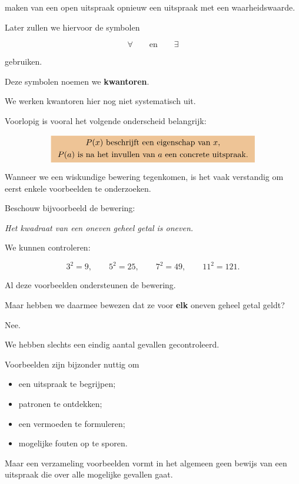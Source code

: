 \documentclass{ximera}
\begin{document}
maken van een open uitspraak opnieuw een uitspraak met een
waarheidswaarde.

Later zullen we hiervoor de symbolen

\[
\forall
\qquad\text{en}\qquad
\exists
\]

gebruiken.

Deze symbolen noemen we \textbf{kwantoren}.


\begin{opmerking}
We werken kwantoren hier nog niet systematisch uit.

Voorlopig is vooral het volgende onderscheid belangrijk:

\[
\important{
\begin{array}{c}
P(x) \text{ beschrijft een eigenschap van }x,\\[1mm]
P(a) \text{ is na het invullen van }a\text{ een concrete uitspraak.}
\end{array}
}
\]
\end{opmerking}



Wanneer we een wiskundige bewering tegenkomen, is het vaak verstandig
om eerst enkele voorbeelden te onderzoeken.

Beschouw bijvoorbeeld de bewering:

\begin{center}
\textit{Het kwadraat van een oneven geheel getal is oneven.}
\end{center}

We kunnen controleren:

\[
3^2=9,
\qquad
5^2=25,
\qquad
7^2=49,
\qquad
11^2=121.
\]

Al deze voorbeelden ondersteunen de bewering.

Maar hebben we daarmee bewezen dat ze voor \textbf{elk} oneven geheel
getal geldt?

Nee.

We hebben slechts een eindig aantal gevallen gecontroleerd.


\begin{opmerking}
Voorbeelden zijn bijzonder nuttig om

\begin{itemize}
  \item een uitspraak te begrijpen;
  \item patronen te ontdekken;
  \item een vermoeden te formuleren;
  \item mogelijke fouten op te sporen.
\end{itemize}

Maar een verzameling voorbeelden vormt in het algemeen geen bewijs
van een uitspraak die over alle mogelijke gevallen gaat.
\end{opmerking}
\end{document}
